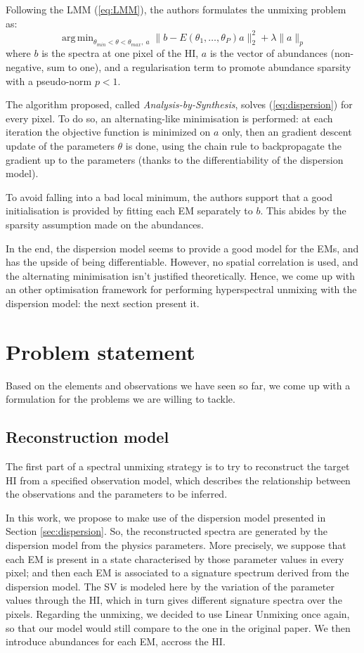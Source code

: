 \documentclass{article}
\DeclareMathOperator*{\argmin}{arg\,min}
\begin{document}
Following the LMM (\ref{eq:LMM}), the authors formulates the unmixing problem as:
\begin{equation}\label{eq:dispersion}
  \argmin_{\theta_{min} < \theta < \theta_{max},\ a} \| b - E(\theta_1, \dots, \theta_P) a \|_2^2 + \lambda \| a \|_p
\end{equation}
where $b$ is the spectra at one pixel of the HI, $a$ is the vector of abundances (non-negative, sum to one), and a regularisation term to promote abundance sparsity with a pseudo-norm $p < 1$.

The algorithm proposed, called \emph{Analysis-by-Synthesis}, solves (\ref{eq:dispersion}) for every pixel. To do so, an alternating-like minimisation is performed: at each iteration the objective function is minimized on $a$ only, then an gradient descent update of the parameters $\theta$ is done, using the chain rule to backpropagate the gradient up to the parameters (thanks to the differentiability of the dispersion model).

To avoid falling into a bad local minimum, the authors support that a good initialisation is provided by fitting each EM separately to $b$. This abides by the sparsity assumption made on the abundances.

In the end, the dispersion model seems to provide a good model for the EMs, and has the upside of being differentiable. However, no spatial correlation is used, and the alternating minimisation isn't justified theoretically. Hence, we come up with an other optimisation framework for performing hyperspectral unmixing with the dispersion model: the next section present it.


\section{Problem statement}\label{sec:prob}
Based on the elements and observations we have seen so far, we come up with a formulation for the problems we are willing to tackle.

\subsection{Reconstruction model}
The first part of a spectral unmixing strategy is to try to reconstruct the target HI from a specified observation model, which describes the relationship between the observations and the parameters to be inferred.

In this work, we propose to make use of the dispersion model presented in Section \ref{sec:dispersion}. So, the reconstructed spectra are generated by the dispersion model from the physics parameters. More precisely, we suppose that each EM is present in a state characterised by those parameter values in every pixel; and then each EM is associated to a signature spectrum derived from the dispersion model. The SV is modeled here by the variation of the parameter values through the HI, which in turn gives different signature spectra over the pixels. Regarding the unmixing, we decided to use Linear Unmixing once again, so that our model would still compare to the one in the original paper. We then introduce abundances for each EM, accross the HI.
\end{document}
